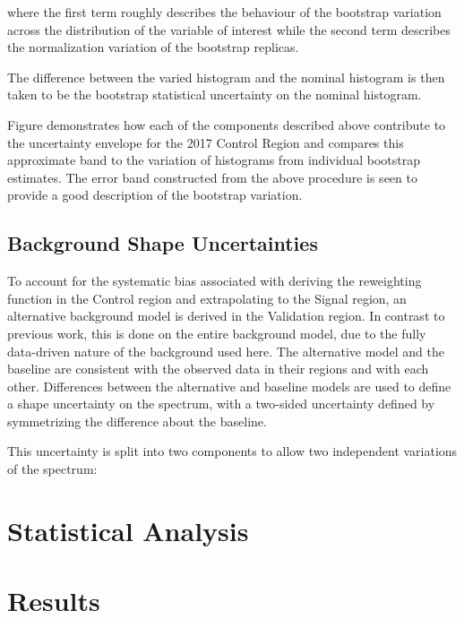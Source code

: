 where the first term roughly describes the behaviour of the bootstrap variation across the distribution of 
the variable of interest while the second term describes the normalization variation of the bootstrap replicas.

The difference between the varied histogram and the nominal histogram is then
taken to be the bootstrap statistical uncertainty on the nominal histogram.

Figure  demonstrates how each of the components described above
contribute to the uncertainty envelope for the 2017 Control Region 
and compares this approximate band to the variation of histograms from individual bootstrap 
estimates. The error band constructed from the above procedure is seen to provide a good 
description of the bootstrap variation.

\subsection{Background Shape Uncertainties}
To account for the systematic bias associated with deriving the reweighting function
in the Control region and extrapolating to the Signal region, an alternative background
model is derived in the Validation region. In contrast to previous work, this is
done on the entire background model, due to the fully data-driven nature of the
background used here. The alternative model and the baseline are consistent with
the observed data in their regions and with each other. Differences between the
alternative and baseline models are used to define a shape uncertainty on the \mhh
spectrum, with a two-sided uncertainty defined by symmetrizing the difference about
the baseline.

This uncertainty is split into two components to allow two independent
variations of the \mhh spectrum: 

\section{Statistical Analysis}
\section{Results}
